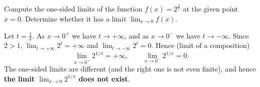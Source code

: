 
\begin{question}
Compute the one-sided limits of the function $f(x)=2^{\frac{1}{x}}$ at the given point $x=0$. Determine whether it has a limit $\lim_{x\to 0}f(x)$.
\end{question}

\begin{solution}
Let $t=\frac1x$. As $x\to 0^+$ we have $t\to+\infty$, and as $x\to 0^-$ we have $t\to-\infty$. Since $2>1$, $\lim_{t\to+\infty}2^t=+\infty$ and $\lim_{t\to-\infty}2^t=0$. Hence (limit of a composition)
\[ \lim_{x\to0^+}2^{1/x}=+\infty,\qquad \lim_{x\to0^-}2^{1/x}=0. \]
The one-sided limits are different (and the right one is not even finite), and hence \textbf{the limit $\lim_{x\to0}2^{1/x}$ does not exist}.
\end{solution}
